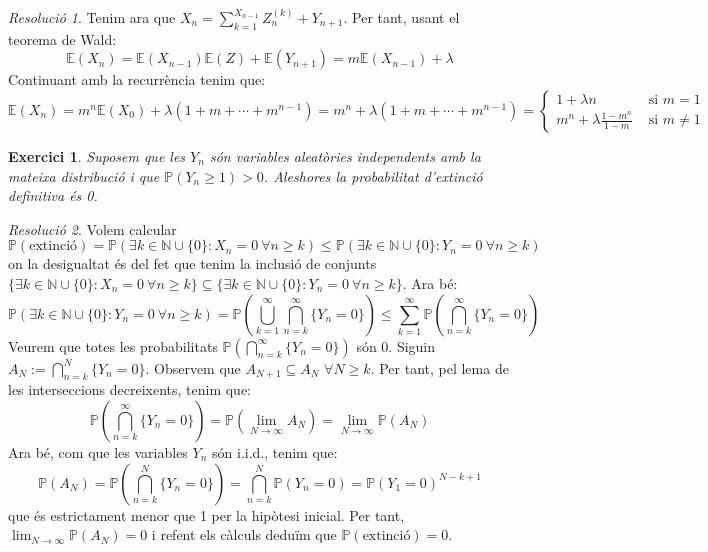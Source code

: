 \documentclass[10pt,a4paper]{article}
\newcommand{\NN}{\ensuremath{\mathbb{N}}} %
\newcommand{\Prob}{\ensuremath{\mathbb{P}}} %
\newcommand{\Exp}{\mathbb{E}} %
\newcommand{\iid}{i.i.d.} %
\newtheorem{exercici}{Exercici}
\theoremstyle{definition}
\theoremstyle{remark}
\newtheorem*{res}{Resolució}
\begin{document}
\begin{res}
  Tenim ara que $X_n=\sum_{k=1}^{X_{n-1}}Z_n^{(k)}+Y_{n+1}$. Per tant, usant el teorema de Wald:
  $$\Exp\left(X_n\right)=\Exp(X_{n-1})\Exp(Z)+\Exp(Y_{n+1})=m\Exp(X_{n-1})+\lambda$$
  Continuant amb la recurrència tenim que:
  $$\Exp\left(X_n\right)=m^n\Exp(X_0)+\lambda(1+m+\cdots+m^{n-1})=m^n+\lambda(1+m+\cdots+m^{n-1})=
    \begin{cases}
      1+ \lambda n                 & \text{ si $m=1$}    \\
      m^n+\lambda\frac{1-m^n}{1-m} & \text{ si $m\ne 1$}
    \end{cases}$$

\end{res}
\begin{exercici}
  Suposem que les $Y_n$ són variables aleatòries independents amb la mateixa distribució i que $\Prob(Y_n\geq 1)>0$. Aleshores la probabilitat d'extinció definitiva és 0.
\end{exercici}
\begin{res}
  Volem calcular $$\Prob(\text{extinció})=\Prob\left(\exists k\in\NN\cup\{0\}:X_n=0\ \forall n\geq k\right)\leq\Prob\left(\exists k\in\NN\cup\{0\}:Y_n=0\ \forall n\geq k\right)$$
  on la desigualtat és del fet que tenim la inclusió de conjunts $\{\exists k\in\NN\cup\{0\}:X_n=0\ \forall n\geq k\}\subseteq\{\exists k\in\NN\cup\{0\}:Y_n=0\ \forall n\geq k\}$. Ara bé:
  $$\Prob\left(\exists k\in\NN\cup\{0\}:Y_n=0\ \forall n\geq k\right)=\Prob\left(\bigcup_{k=1}^\infty\bigcap_{n=k}^\infty\{Y_n=0\}\right)\leq\sum_{k=1}^\infty\Prob\left(\bigcap_{n=k}^\infty \{Y_n=0\}\right)$$
  Veurem que totes les probabilitats $\Prob\left(\bigcap_{n=k}^\infty \{Y_n=0\}\right)$ són 0. Siguin $A_N:=\bigcap_{n=k}^N \{Y_n=0\}$. Observem que $A_{N+1}\subseteq A_{N}$ $\forall N\geq k$. Per tant, pel lema de les interseccions decreixents, tenim que:
  $$\Prob\left(\bigcap_{n=k}^\infty \{Y_n=0\}\right)=\Prob\left(\lim_{N\to\infty}A_N\right)=\lim_{N\to\infty}\Prob(A_N)$$
  Ara bé, com que les variables $Y_n$ són \iid, tenim que:
  $$\Prob(A_N)=\Prob\left(\bigcap_{n=k}^N \{Y_n=0\}\right)=\bigcap_{n=k}^N \Prob\left(Y_n=0\right)={\Prob(Y_1=0)}^{N-k+1}$$
  que és estrictament menor que 1 per la hipòtesi inicial. Per tant, $\displaystyle\lim_{N\to\infty}\Prob(A_N)=0$ i refent els càlculs deduïm que $\Prob(\text{extinció})=0$.
\end{res}
\end{document}
